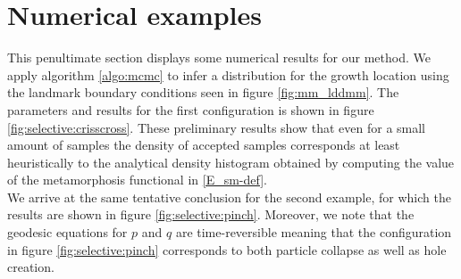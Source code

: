\documentclass[runningheads]{llncs}
\begin{document}
\section{Numerical examples}\label{sec:numerical}

This penultimate section displays some numerical results for our method. We
apply algorithm \ref{algo:mcmc} to infer a distribution for the
growth location using the landmark boundary conditions seen in figure
\ref{fig:mm_lddmm}. The parameters and results for the first configuration is
shown in figure \eqref{fig:selective:crisscross}. These preliminary results show
that even for a small amount of samples the density of accepted samples
corresponds at least heuristically to the analytical density histogram obtained
by computing the value of the metamorphosis functional in \eqref{E_sm-def}.\\

We arrive at the same tentative conclusion for the second example, for which the
results are shown in figure \eqref{fig:selective:pinch}. Moreover, we note that
the geodesic equations for $p$ and $q$ are time-reversible meaning that the
configuration in figure \ref{fig:selective:pinch} corresponds to both particle
collapse as well as hole creation. 
\end{document}

